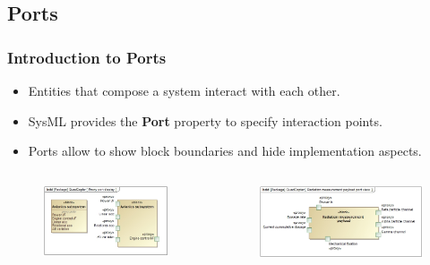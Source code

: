\documentclass[xcolor=dvipsnames,t]{beamer}
\begin{document}
\subsection{Ports}



\begin{frame}
\frametitle{Introduction to Ports}
\begin{itemize}
\item Entities that compose a system interact with each other.
\item SysML provides the \textbf{Port} property to specify interaction points.
\item Ports allow to show block boundaries and hide implementation aspects.
\end{itemize}

\vspace{-5mm}
\begin{columns}
\begin{column}{0.5\textwidth}
\begin{figure}
 	\includegraphics[width=\textwidth]{PortIntroductionI.jpg}
\end{figure}

\end{column}
\begin{column}{0.5\textwidth}
\begin{figure}
 	\includegraphics[width=\textwidth]{RadPayload.jpg}
\end{figure}
\end{column}
\end{columns}


\end{frame}
\end{document}
